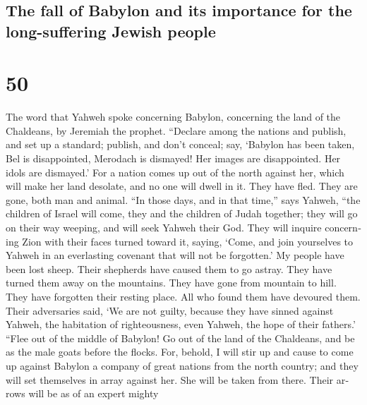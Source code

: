 \begin{paracol}{2}
\switchcolumn
\begin{otherlanguage}{english}

\hypertarget{the-fall-of-babylon-and-its-importance-for-the-long-suffering-jewish-people}{%
\subsection{The fall of Babylon and its importance for the
long-suffering Jewish
people}\label{the-fall-of-babylon-and-its-importance-for-the-long-suffering-jewish-people}}

\hypertarget{section-99}{%
\section{50}\label{section-99}}

 The word that Yahweh spoke concerning Babylon, concerning
the land of the Chaldeans, by Jeremiah the prophet. 
``Declare among the nations and publish, and set up a standard; publish,
and don't conceal; say, `Babylon has been taken, Bel is disappointed,
Merodach is dismayed! Her images are disappointed. Her idols are
dismayed.'  For a nation comes up out of the north against
her, which will make her land desolate, and no one will dwell in it.
They have fled. They are gone, both man and animal.  ``In
those days, and in that time,'' says Yahweh, ``the children of Israel
will come, they and the children of Judah together; they will go on
their way weeping, and will seek Yahweh their God.  They
will inquire concerning Zion with their faces turned toward it, saying,
`Come, and join yourselves to Yahweh in an everlasting covenant that
will not be forgotten.'  My people have been lost sheep.
Their shepherds have caused them to go astray. They have turned them
away on the mountains. They have gone from mountain to hill. They have
forgotten their resting place.  All who found them have
devoured them. Their adversaries said, `We are not guilty, because they
have sinned against Yahweh, the habitation of righteousness, even
Yahweh, the hope of their fathers.'  ``Flee out of the
middle of Babylon! Go out of the land of the Chaldeans, and be as the
male goats before the flocks.  For, behold, I will stir up
and cause to come up against Babylon a company of great nations from the
north country; and they will set themselves in array against her. She
will be taken from there. Their arrows will be as of an expert mighty

\end{otherlanguage}
\end{paracol}
